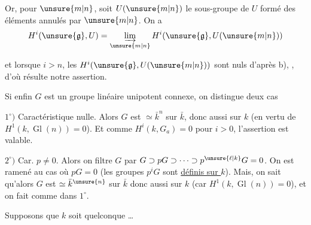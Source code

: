 Or, pour \deleted{$\unsure{\forall}$} $\unsure{m|n}$, soit $U(\unsure{m|n})$ le sous-groupe de $U$ formé des éléments annulés par $\unsure{m|n}$. On a
\[
H^i(\unsure{\mathfrak g},U)=\varinjlim_{\unsure{m|n}}H^i(\unsure{\mathfrak g},U(\unsure{m|n}))
\]



et lorsque $i>n$, les  $H^i(\unsure{\mathfrak g},U(\unsure{m|n}))$ sont nuls d'après b), , d'où résulte notre assertion.

Si enfin $G$ est  un groupe linéaire unipotent connexe, on distingue deux cas

$1^\circ)$ Caractéristique nulle. Alors $G$ est $\simeq\bar k^n$ sur $\bar k$, donc aussi sur $k$ (en vertu de $H^1(k,\operatorname{Gl}(n))=0$).
Et comme $H^i(k,G_a)=0$ pour $i>0$, l'assertion est valable.

$2^\circ)$ Car. $p\ne0$. Alors on filtre $G$ par $G\supset pG\supset\cdots\supset p^{\unsure{\ell|k}}G=0$. On est ramené au cas où $pG=0$ (les groupes $p^iG$ sont \uline{définis sur $k$}).
Mais, on sait qu'alors $G$ est $\simeq\bar k^{\unsure{n}}$ sur $\bar k$ donc \deleted{$\unsure{\simeq}$} aussi sur $k$ (car $H^1(k,\operatorname{Gl}(n))=0$), et on fait comme dans $1^\circ$.

Supposons que $k$ soit quelconque \ldots



